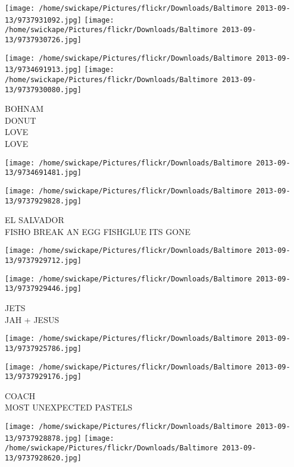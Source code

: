 \documentclass[10pt,letterpaper]{article}
\begin{document}
\texttt{[image: /home/swickape/Pictures/flickr/Downloads/Baltimore 2013-09-13/9737931092.jpg]}
\texttt{[image: /home/swickape/Pictures/flickr/Downloads/Baltimore 2013-09-13/9737930726.jpg]}

\texttt{[image: /home/swickape/Pictures/flickr/Downloads/Baltimore 2013-09-13/9734691913.jpg]}
\texttt{[image: /home/swickape/Pictures/flickr/Downloads/Baltimore 2013-09-13/9737930080.jpg]}

BOHNAM\\
DONUT\\
LOVE\\
LOVE\\
\pagebreak

\texttt{[image: /home/swickape/Pictures/flickr/Downloads/Baltimore 2013-09-13/9734691481.jpg]}

\vspace{0.25in}
\texttt{[image: /home/swickape/Pictures/flickr/Downloads/Baltimore 2013-09-13/9737929828.jpg]}

EL SALVADOR\\
FISHO BREAK AN EGG FISHGLUE ITS GONE\\
\pagebreak

\texttt{[image: /home/swickape/Pictures/flickr/Downloads/Baltimore 2013-09-13/9737929712.jpg]}

\vspace{0.25in}
\texttt{[image: /home/swickape/Pictures/flickr/Downloads/Baltimore 2013-09-13/9737929446.jpg]}

JETS\\
JAH + JESUS\\
\pagebreak

\texttt{[image: /home/swickape/Pictures/flickr/Downloads/Baltimore 2013-09-13/9737925786.jpg]}

\vspace{0.25in}
\texttt{[image: /home/swickape/Pictures/flickr/Downloads/Baltimore 2013-09-13/9737929176.jpg]}

COACH\\
MOST UNEXPECTED PASTELS\\
\pagebreak

\texttt{[image: /home/swickape/Pictures/flickr/Downloads/Baltimore 2013-09-13/9737928878.jpg]}
\texttt{[image: /home/swickape/Pictures/flickr/Downloads/Baltimore 2013-09-13/9737928620.jpg]}
\end{document}
